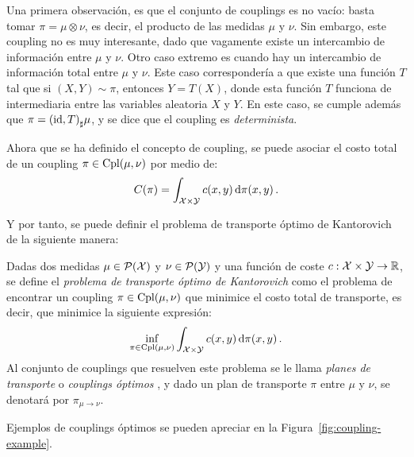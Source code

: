 {{	  Una primera observación, es que el conjunto de couplings es no vacío: basta tomar $\pi = \mu \otimes \nu$, es decir, el producto de las medidas $\mu$ y $\nu$. Sin embargo, este coupling no es muy interesante, dado que vagamente existe un intercambio de información entre $\mu$ y $\nu$. Otro caso extremo es cuando hay un intercambio de información total entre $\mu$ y $\nu$. Este caso correspondería a que existe una función $T$ tal que si $(X, Y) \sim \pi$, entonces $Y = T(X)$, donde esta función $T$ funciona de intermediaria entre las variables aleatoria $X$ y $Y$. En este caso, se cumple además que $\pi = \pf{(\id, T)} \mu$, y se dice que el coupling es \emph{determinista}.

	  Ahora que se ha definido el concepto de coupling, se puede asociar el costo total de un coupling $\pi \in \Cpl(\mu, \nu)$ por medio de:
	  \begin{equation}
		  C(\pi) = \int_{\cX \times \cY} c(x, y) \dpi[x, y].
	  \end{equation}

	  Y por tanto, se puede definir el problema de transporte óptimo de Kantorovich de la siguiente manera:

	  \begin{definition}
		  Dadas dos medidas $\mu \in \ProbSpace[\cX]$ y $\nu \in \ProbSpace[\cY]$ y una función de coste $c: \cX \times \cY \to \R$, se define el \emph{problema de transporte óptimo de Kantorovich} como el problema de encontrar un coupling $\pi \in \Cpl(\mu, \nu)$ que minimice el costo total de transporte, es decir, que minimice la siguiente expresión:
		  \begin{equation}
			  \label{eq:problemaTransporteKantorovich}
			  \inf_{\pi \in \Cpl(\mu, \nu)} \int_{\cX \times \cY} c(x, y) \dpi[x, y] .
		  \end{equation}
		  Al conjunto de couplings que resuelven este problema se le llama \emph{planes de transporte} o \emph{couplings óptimos} , y dado un plan de transporte $\pi$ entre $\mu$ y $\nu$, se denotará por $\pi_{\mu \to \nu}$.
	  \end{definition}

	  Ejemplos de couplings óptimos se pueden apreciar en la Figura~\ref{fig:coupling-example}.

}}
